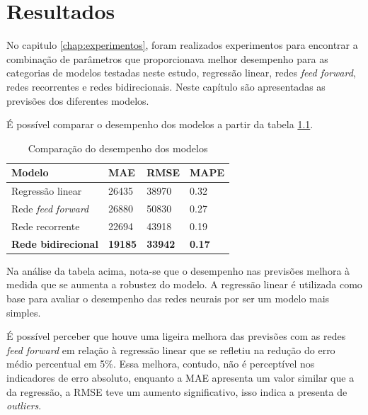 
\chapter{Resultados}
\label{chap:resultados}

No capitulo \ref{chap:experimentos}, foram realizados experimentos para encontrar a combinação de 
parâmetros que proporcionava melhor desempenho para as categorias de modelos 
testadas neste estudo, regressão linear, redes \textit{feed forward}, redes
recorrentes e redes bidirecionais. Neste capítulo são apresentadas as previsões 
dos diferentes modelos.

É possível comparar o desempenho dos modelos a partir da tabela \ref{tab:compara_modelos}.

\begin{table}[H]
    \centering
    \begin{tabular}{llll}
        \toprule
        Modelo & MAE     & RMSE    & MAPE \\
        \midrule
        Regressão linear & 26435 & 38970 & 0.32  \\
        Rede \textit{feed forward} & 26880  & 50830 & 0.27 \\
        Rede recorrente & 22694 & 43918 & 0.19  \\
        \textbf{Rede bidirecional} & \textbf{19185} & \textbf{33942} & \textbf{0.17} \\
        \bottomrule
    \end{tabular}
    \caption{Comparação do desempenho dos modelos}
    \label{tab:compara_modelos}
\end{table}

Na análise da tabela acima, nota-se que o desempenho nas previsões
melhora à medida que se aumenta a robustez do modelo. A regressão linear é utilizada 
como base para avaliar o desempenho das redes neurais por ser um modelo mais 
simples. 

É possível perceber que houve uma ligeira melhora das previsões com as 
redes \textit{feed forward} em relação à regressão linear que se refletiu na 
redução do erro médio percentual
em 5\%. Essa melhora, contudo, não é perceptível nos indicadores de erro absoluto,
enquanto a MAE apresenta um valor similar que a da regressão, a RMSE teve um 
aumento significativo, isso indica a presenta de \textit{outliers}.

